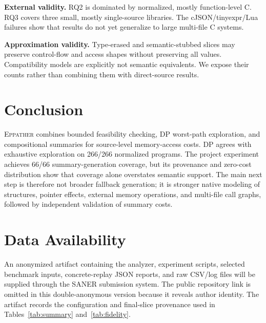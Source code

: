 \documentclass[10pt,conference]{IEEEtran}
\newcommand{\tool}{\textsc{Eppather}\xspace}
\begin{document}
\textbf{External validity.} RQ2 is dominated by normalized, mostly function-level C. RQ3 covers three small, mostly single-source libraries. The cJSON/tinyexpr/Lua failures show that results do not yet generalize to large multi-file C systems.

\textbf{Approximation validity.} Type-erased and semantic-stubbed slices may preserve control-flow and access shapes without preserving all values. Compatibility models are explicitly not semantic equivalents. We expose their counts rather than combining them with direct-source results.

\section{Conclusion}
\tool combines bounded feasibility checking, DP worst-path exploration, and compositional summaries for source-level memory-access costs. DP agrees with exhaustive exploration on 266/266 normalized programs. The project experiment achieves 66/66 summary-generation coverage, but its provenance and zero-cost distribution show that coverage alone overstates semantic support. The main next step is therefore not broader fallback generation; it is stronger native modeling of structures, pointer effects, external memory operations, and multi-file call graphs, followed by independent validation of summary costs.

\section{Data Availability}
An anonymized artifact containing the analyzer, experiment scripts, selected benchmark inputs, concrete-replay JSON reports, and raw CSV/log files will be supplied through the SANER submission system. The public repository link is omitted in this double-anonymous version because it reveals author identity. The artifact records the configuration and final-slice provenance used in Tables~\ref{tab:summary} and~\ref{tab:fidelity}.
\end{document}
